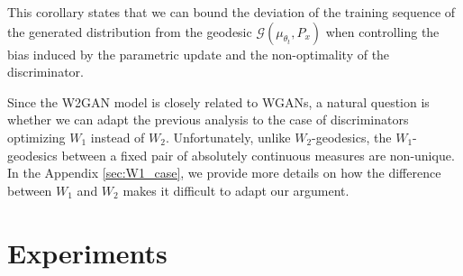 \documentclass[runningheads]{llncs}
\begin{document}
This corollary states that we can bound the deviation of the training sequence of the generated distribution from the geodesic $\mathcal{G}(\mu_{\theta_t},P_x)$ when controlling the bias induced by the parametric update and the non-optimality of the discriminator. 


Since the W2GAN model is closely related to WGANs, a natural question is whether we can adapt the previous analysis to the case of discriminators optimizing $W_1$ instead of $W_2$.
Unfortunately, unlike $W_2$-geodesics, the $W_1$-geodesics between a fixed pair of absolutely continuous measures are non-unique. In the Appendix \ref{sec:W1_case}, we provide more details on how the difference between $W_1$ and $W_2$ makes it difficult to adapt our argument. 





\section{Experiments}
\label{sec:exps}


\end{document}
